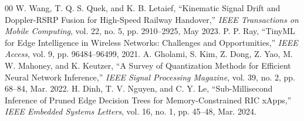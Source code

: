 \documentclass[conference]{IEEEtran}
\begin{document}
\begin{thebibliography}{00}
 W. Wang, T. Q. S. Quek, and K. B. Letaief, ``Kinematic Signal Drift and Doppler-RSRP Fusion for High-Speed Railway Handover,'' \textit{IEEE Transactions on Mobile Computing}, vol. 22, no. 5, pp. 2910--2925, May 2023.
 P. P. Ray, ``TinyML for Edge Intelligence in Wireless Networks: Challenges and Opportunities,'' \textit{IEEE Access}, vol. 9, pp. 96484--96499, 2021.
 A. Gholami, S. Kim, Z. Dong, Z. Yao, M. W. Mahoney, and K. Keutzer, ``A Survey of Quantization Methods for Efficient Neural Network Inference,'' \textit{IEEE Signal Processing Magazine}, vol. 39, no. 2, pp. 68--84, Mar. 2022.
 H. Dinh, T. V. Nguyen, and C. Y. Le, ``Sub-Millisecond Inference of Pruned Edge Decision Trees for Memory-Constrained RIC xApps,'' \textit{IEEE Embedded Systems Letters}, vol. 16, no. 1, pp. 45--48, Mar. 2024.
\end{thebibliography}
\end{document}
